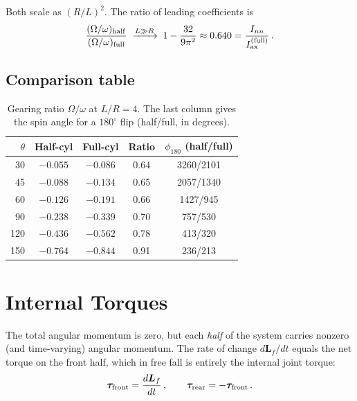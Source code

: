 \documentclass[11pt]{article}
\newcommand{\vect}[1]{\bm{#1}}
\begin{document}
Both scale as $(R/L)^2$.  The ratio of leading coefficients is
\begin{equation}
\frac{(\Omega/\omega)_{\rm half}}{(\Omega/\omega)_{\rm full}}
\;\xrightarrow{L\gg R}\;
1-\frac{32}{9\pi^2}\approx0.640
= \frac{I_{nn}}{I_{\rm ax}^{(\rm full)}}\,.
\end{equation}

\subsection{Comparison table}

\begin{table}[H]
\centering
\caption{Gearing ratio $\Omega/\omega$ at $L/R=4$.  The last column
gives the spin angle for a $180^\circ$ flip (half/full, in degrees).}
\label{tab:compare}
\medskip
\begin{tabular}{@{}rcccc@{}}
\toprule
$\theta$ & Half-cyl & Full-cyl & Ratio & $\phi_{180}$ (half/full) \\
\midrule
 30 & $-0.055$ & $-0.086$ & 0.64 & 3260/2101 \\
 45 & $-0.088$ & $-0.134$ & 0.65 & 2057/1340 \\
 60 & $-0.126$ & $-0.191$ & 0.66 & 1427/945 \\
 90 & $-0.238$ & $-0.339$ & 0.70 & 757/530 \\
120 & $-0.436$ & $-0.562$ & 0.78 & 413/320 \\
150 & $-0.764$ & $-0.844$ & 0.91 & 236/213 \\
\bottomrule
\end{tabular}
\end{table}

\section{Internal Torques}
\label{sec:torques}

The total angular momentum is zero, but each \emph{half} of the system
carries nonzero (and time-varying) angular momentum.  The rate of change
$d\vect{L}_f/dt$ equals the net torque on the front half, which in free
fall is entirely the internal joint torque:
\begin{equation}
\vect{\tau}_{\rm front} = \frac{d\vect{L}_f}{dt}\,,\qquad
\vect{\tau}_{\rm rear} = -\vect{\tau}_{\rm front}\,.
\end{equation}
\end{document}
